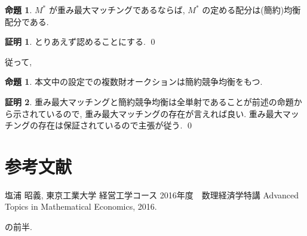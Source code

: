 \documentclass[10pt, fleqn, label-section=none]{bxjsarticle}
\theoremstyle{definition}
\newtheorem{prop}[dfn]{命題}
\newtheorem*{pf*}{証明}
\renewcommand{\;}{\, ; \,}
\begin{document}
\begin{prop}
$M^*$ が重み最大マッチングであるならば, $M^*$ の定める配分は(簡約)均衡配分である. 
\end{prop}
\begin{pf*}
とりあえず認めることにする.  
\qed
\end{pf*}

従って, 

\begin{prop}
本文中の設定での複数財オークションは簡約競争均衡をもつ. 
\end{prop}
\begin{pf*}
重み最大マッチングと簡約競争均衡は全単射であることが前述の命題から示されているので, 重み最大マッチングの存在が言えれば良い. 重み最大マッチングの存在は保証されているので主張が従う. 
\qed
\end{pf*}

\section{参考文献}

塩浦 昭義, 東京工業大学 経営工学コース 2016年度　数理経済学特講   Advanced Topics in Mathematical Economics, 2016.

の前半.
\end{document}
